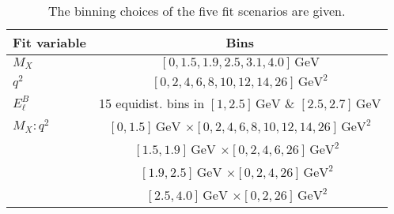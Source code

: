 \documentclass[twocolumn,aps,prd,superscriptaddress,nofootinbib,floatfix,preprintnumbers,a4]{revtex4-1}
\begin{document}
\begin{table}[b!]
\caption{
	The binning choices of the five fit scenarios are given. 
}
\label{tab:bins}
\vspace{1ex}
\begin{tabular}{lc}
\hline\hline
  Fit variable & Bins  \\
 \hline
 $M_X$ & $[0,1.5, 1.9, 2.5, 3.1, 4.0] \, \text{GeV}$ \\
 $q^2 $ & $[0, 2, 4, 6, 8, 10, 12, 14, 26] \, \text{GeV}^2$\\
$E_\ell^B$ & 15 equidist. bins in $[1, 2.5] \, \text{GeV}$ \& $[2.5, 2.7] \, \text{GeV}$ \\
 $M_X:q^2$ & $ [0,1.5]  \, \text{GeV}$ $\times [0, 2, 4, 6, 8, 10, 12, 14, 26]  \, \text{GeV}^2$ \\ 
 &$ [1.5,1.9]  \, \text{GeV}$ $\times [0, 2, 4, 6, 26]  \, \text{GeV}^2$\ \\
 &$ [1.9,2.5]  \, \text{GeV}$ $\times [0, 2, 4, 26]  \, \text{GeV}^2$\ \\
 &$ [2.5,4.0]  \, \text{GeV}$ $\times [0, 2, 26]  \, \text{GeV}^2$\ \\
 \hline\hline
\end{tabular}
\end{table}
\end{document}
